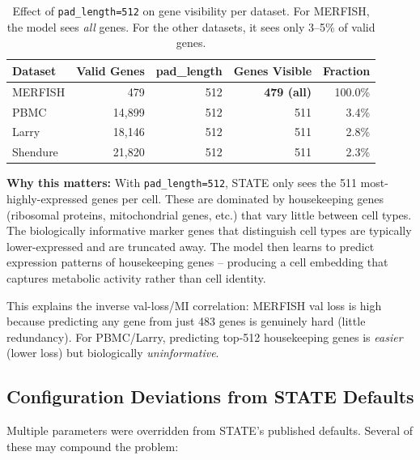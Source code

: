 \documentclass[11pt,a4paper]{article}
\begin{document}
\begin{table}[H]
\centering
\caption{Effect of \texttt{pad\_length=512} on gene visibility per dataset. For MERFISH, the model sees \emph{all} genes. For the other datasets, it sees only 3--5\% of valid genes.}
\label{tab:padlength}
\begin{tabular}{lrrrr}
\toprule
Dataset & Valid Genes & pad\_length & Genes Visible & Fraction \\
\midrule
MERFISH   & 479    & 512 & \textbf{479 (all)} & 100.0\% \\
PBMC      & 14,899 & 512 & 511               & 3.4\% \\
Larry     & 18,146 & 512 & 511               & 2.8\% \\
Shendure  & 21,820 & 512 & 511               & 2.3\% \\
\bottomrule
\end{tabular}
\end{table}

\noindent\textbf{Why this matters:} With \texttt{pad\_length=512}, STATE only sees the 511 most-highly-expressed genes per cell. These are dominated by housekeeping genes (ribosomal proteins, mitochondrial genes, etc.) that vary little between cell types. The biologically informative marker genes that distinguish cell types are typically lower-expressed and are truncated away. The model then learns to predict expression patterns of housekeeping genes -- producing a cell embedding that captures metabolic activity rather than cell identity.

\noindent This explains the inverse val-loss/MI correlation: MERFISH val loss is high because predicting any gene from just 483 genes is genuinely hard (little redundancy). For PBMC/Larry, predicting top-512 housekeeping genes is \emph{easier} (lower loss) but biologically \emph{uninformative}.

\subsection{Configuration Deviations from STATE Defaults}

Multiple parameters were overridden from STATE's published defaults. Several of these may compound the problem:
\end{document}
